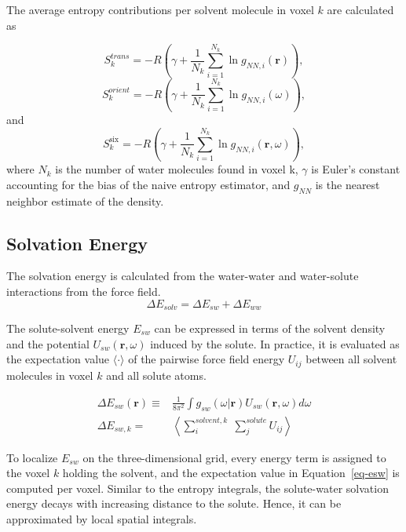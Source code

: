 \documentclass[9pt,tutorial]{livecoms}
\begin{document}
The average entropy contributions per solvent molecule in voxel $k$ are calculated as

\begin{equation}
	S_{k}^\textit{trans} = -R \left( \gamma + \frac{1}{N_\textit{k}} \sum _{i=1}^{N_k} \ln g_{NN, \textit{i}}(\textbf{r}) \right),
\end{equation}
\begin{equation}
S_{k}^\textit{orient} = -R \left( \gamma + \frac{1}{N_k} \sum _{i=1}^{N_k} \ln g_{NN, i}(\omega) \right)
,
\end{equation}
and
\begin{equation}
S_\textit{k}^\text{six} = -R \left( \gamma + \frac{1}{N_\textit{k}} \sum _{i=1}^{N_k} \ln g_{NN, \textit{i}}(\textbf{r},\omega) \right),
\end{equation}
where $N_\textit{k}$ is the number of water molecules found in voxel k, $\gamma$ is Euler's constant accounting for the bias of the naive entropy estimator, and $g_\textit{NN}$ is the nearest neighbor estimate of the density.

\subsection{Solvation Energy}
The solvation energy is calculated from the water-water and water-solute interactions from the force field.
\begin{equation}
	\Delta E_\textit{solv} = \Delta E_\textit{sw} + \Delta E_\textit{ww}
\end{equation}

The solute-solvent energy $E_{sw}$ can be expressed in terms of the solvent density and the potential $U_{sw}(\textbf{r},\omega)$ induced by the solute.
In practice, it is evaluated as the expectation value $\langle\cdot\rangle$ of the pairwise force field energy $U_{ij}$ between all solvent molecules in voxel $k$ and all solute atoms.

\begin{equation}
	\begin{aligned}
		\label{eq-esw}
		\Delta E_{sw}(\textbf{r}) \equiv& \frac{1}{8\pi^2} \int g_\textit{sw}\left(\omega|\textbf{r}\right) U_\textit{sw}\left(\textbf{r}, \omega\right) d\omega \\
		\Delta E_{sw,k}=& \left\langle \sum_i^{\textit{solvent},k} \; \sum_j^\textit{solute} U_{ij}\right\rangle
	\end{aligned}
\end{equation}

To localize $E_{sw}$ on the three-dimensional grid, every energy term is assigned to the voxel $k$ holding the solvent, and the expectation value in Equation~\ref{eq-esw} is computed per voxel.
Similar to the entropy integrals, the solute-water solvation energy decays with increasing distance to the solute.
Hence, it can be approximated by local spatial integrals. 
\end{document}
